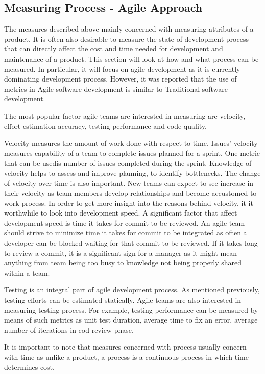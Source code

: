 \documentclass[11pt]{article}
\begin{document}
\subsection{Measuring Process - Agile Approach}
The measures described above mainly concerned with measuring attributes of a product. It is often also desirable to measure the state of development process that can directly affect the cost and time needed for development and maintenance of a product. This section will look at how and what process can be measured. In particular, it will focus on agile development as it is currently dominating development process. However, it was reported that the use of metrics in Agile software development is similar to Traditional software development.\cite{Kupiainen:2015:UMA:2784072.2784627}
\par 
The most popular factor agile teams are interested in measuring are velocity, effort estimation accuracy, testing performance and code quality.
\par
Velocity measures the amount of work done with respect to time. Issues' velocity measures capability of a team to complete issues planned for a sprint. One metric that can be usedis number of issues completed during the sprint. Knowledge of velocity helps to assess and improve planning, to identify bottlenecks.\cite{Agile-case-study-finland} The change of velocity over time is also important. New teams can expect to see increase in their velocity as team members develop relationships and become accustomed to work process.
In order to get more insight into the reasons behind velocity, it it worthwhile to look into development speed. A significant factor that affect development speed is time it takes for commit to be reviewed. An agile team should strive to minimize time it takes for commit to be integrated as often a developer can be blocked waiting for that commit to be reviewed. If it takes long to review a commit, it is a significant sign for a manager as it might mean anything from team being too busy to knowledge not being properly shared within a team.
\par 
Testing is an integral part of agile development process. As mentioned previously, testing efforts can be estimated statically. Agile teams are also interested in measuring testing process. For example, testing performance can be measured by means of such metrics as unit test duration, average time to fix an error, average number of iterations in cod review phase.
\par 
It is important to note that measures concerned with process usually concern with time as unlike a product, a process is a continuous process in which time determines cost.
\end{document}
